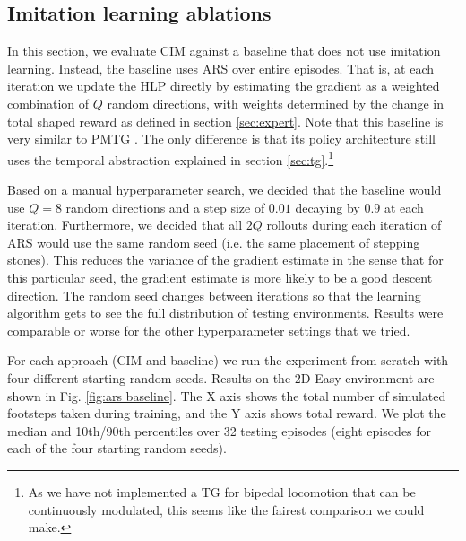\documentclass[conference]{IEEEtran}
\begin{document}

\subsection{Imitation learning ablations}

In this section, we evaluate CIM against a baseline that does not use imitation learning.
Instead, the baseline uses ARS \citep{mania2018simple} over entire episodes.
That is, at each iteration we update the HLP directly by estimating the gradient as a weighted combination of $Q$ random directions,
with weights determined by the change in total shaped reward as defined in section \ref{sec:expert}.
Note that this baseline is very similar to PMTG \citep{iscen2018pmtg}.
The only difference is that its policy architecture still uses the temporal abstraction explained in section \ref{sec:tg}.\footnote{
As we have not implemented a TG for bipedal locomotion that can be continuously modulated, this seems like the fairest comparison we could make.}

Based on a manual hyperparameter search, we decided that the baseline would use $Q=8$ random directions and a step size of $0.01$ decaying by $0.9$ at each iteration.
Furthermore, we decided that all $2Q$ rollouts during each iteration of ARS would use the same random seed (i.e. the same placement of stepping stones).
This reduces the variance of the gradient estimate in the sense that for this particular seed, the gradient estimate is more likely to be a good descent direction.
The random seed changes between iterations so that the learning algorithm gets to see the full distribution of testing environments.
Results were comparable or worse for the other hyperparameter settings that we tried.

For each approach (CIM and baseline) we run the experiment from scratch with four different starting random seeds.
Results on the 2D-Easy environment are shown in Fig. \ref{fig:ars baseline}.
The X axis shows the total number of simulated footsteps taken during training, and the Y axis shows total reward.
We plot the median and 10th/90th percentiles over 32 testing episodes (eight episodes for each of the four starting random seeds).
\end{document}

